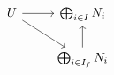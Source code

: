 \documentclass[12pt]{standalone}
\begin{document}
        $$

\begin{tikzcd}
    U \ar[r] \ar[rd] & \bigoplus_{i \in I} N_i \\
    & \bigoplus_{i \in I_f} N_i \ar[u]
\end{tikzcd}
        $$
        
\end{document}
